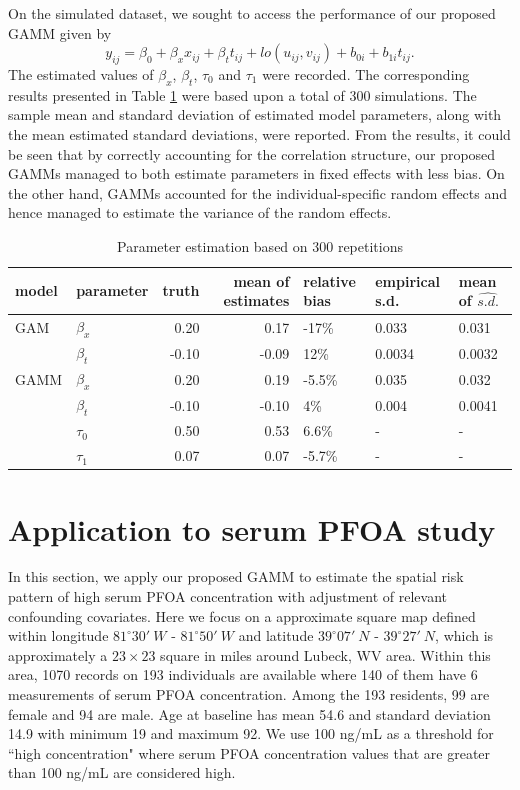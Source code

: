 	On the simulated dataset, we sought to access the performance of our proposed GAMM given by 
	\begin{equation}\label{mod:ammsim2}
	y_{ij} = \beta_0 + \beta_x x_{ij} + \beta_t t_{ij} + lo(u_{ij},v_{ij}) + b_{0i} + b_{1i}t_{ij}.
	\end{equation}
	The estimated values of $\beta_x$, $\beta_t$, $\tau_{0}$ and $\tau_{1}$ were recorded. The corresponding results presented in Table \ref{t:parameterests} were based upon a total of 300 simulations. The sample mean and standard deviation of estimated model parameters, along with the mean estimated standard deviations, were reported. From the results, it could be seen that by correctly accounting for the correlation structure, our proposed GAMMs managed to both estimate parameters in fixed effects with less bias. On the other hand, GAMMs accounted for the individual-specific random effects and hence managed to estimate the variance of the random effects. 
	
	\begin{table}[h]
		\caption{Parameter estimation based on 300 repetitions
			\label{t:parameterests}}
		\centering
		\begin{tabular}{llrrlll}
			\hline
			model & parameter & truth & mean of estimates & relative bias & empirical s.d. & mean of $\hat{s.d.}$ \\     \hline
			GAM & $\beta_x$ & 0.20 & 0.17 & -17\% & 0.033 & 0.031 \\ 
			& $\beta_t$ & -0.10 & -0.09 & 12\% & 0.0034 & 0.0032 \\ 
			GAMM & $\beta_x$ & 0.20 & 0.19 & -5.5\% & 0.035 & 0.032 \\ 
			& $\beta_t$ & -0.10 & -0.10 & 4\% & 0.004 & 0.0041 \\ 
			& $\tau_0$ & 0.50 & 0.53 & 6.6\% & - & - \\ 
			& $\tau_1$ & 0.07 & 0.07 & -5.7\% & - & - \\ 
			\hline
		\end{tabular}
	\end{table}
	
	
	\section{Application to serum PFOA study}
	In this section, we apply our proposed GAMM to estimate the spatial risk pattern of high serum PFOA concentration with adjustment of relevant confounding covariates. Here we focus on a approximate square map defined within longitude $81^{\circ} 30'\  W$ - $81^{\circ} 50'\  W$ and latitude $39^{\circ} 07'\  N$ - $39^{\circ} 27'\  N$, which is approximately a $23\times 23$ square in miles around Lubeck, WV area. Within this area, 1070 records on 193 individuals are available where 140 of them have 6 measurements of serum PFOA concentration. Among the 193 residents, 99 are female and 94 are male. Age at baseline has mean 54.6 and standard deviation 14.9 with minimum 19 and maximum 92. We use 100 ng/mL as a threshold for ``high concentration" where serum PFOA concentration values that are greater than 100 ng/mL are considered high. 
	
